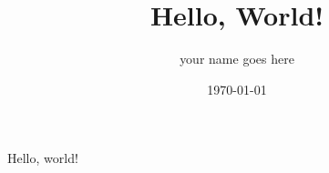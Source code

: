 \documentclass[11pt]{article}
\title{Hello, World!}
\author{your name goes here}
\date{\today}
\begin{document}
    \maketitle

    Hello, world!
\end{document}
